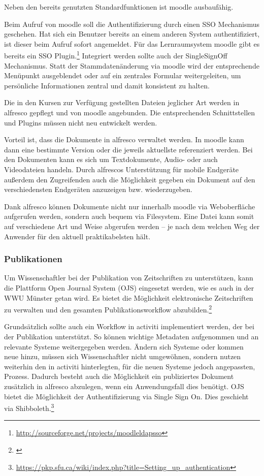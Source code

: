 Neben den bereits genutzten Standardfunktionen ist moodle ausbaufähig.

Beim Aufruf von moodle soll die Authentifizierung durch einen SSO Mechanismus geschehen. Hat sich ein Benutzer bereits an einem anderen System authentifiziert, ist dieser beim Aufruf sofort angemeldet. Für das Lernraumsystem moodle gibt es bereits ein SSO Plugin.\footnote{\url{http://sourceforge.net/projects/moodleldapsso}} Integriert werden sollte auch der SingleSignOff Mechanismus.
Statt der Stammdatenänderung via moodle wird der entsprechende Menüpunkt ausgeblendet oder auf ein zentrales Formular weitergeleiten, um persönliche Informationen zentral und damit konsistent zu halten.

Die in den Kursen zur Verfügung gestellten Dateien jeglicher Art werden in alfresco gepflegt und von moodle angebunden. Die entsprechenden Schnittstellen und Plugins müssen nicht neu entwickelt werden.

Vorteil ist, dass die Dokumente in alfresco verwaltet werden. In moodle kann dann eine bestimmte Version oder die jeweils aktuellste referenziert werden. Bei den Dokumenten kann es sich um Textdokumente, Audio- oder auch Videodateien handeln. Durch alfrescos Unterstützung für mobile Endgeräte außerdem den Zugreifenden auch die Möglichkeit gegeben ein Dokument auf den verschiedensten Endgeräten anzuzeigen bzw. wiederzugeben.

Dank alfresco können Dokumente nicht nur innerhalb moodle via Weboberfläche aufgerufen werden, sondern auch bequem via Filesystem. Eine Datei kann somit auf verschiedene Art und Weise abgerufen werden – je nach dem welchen Weg der Anwender für den aktuell praktikabelsten hält.

\subsubsection{Publikationen}
Um Wissenschaftler bei der Publikation von Zeitschriften zu unterstützen, kann die Plattform Open Journal System (OJS) eingesetzt werden, wie es auch in der WWU Münster getan wird. Es bietet die Möglichkeit elektronische Zeitschriften zu verwalten und den gesamten Publikationsworkflow abzubilden.\footnote{\cite{kloetgen_2012}}

Grundsätzlich sollte auch ein Workflow in activiti implementiert werden, der bei der Publikation unterstützt. So können wichtige Metadaten aufgenommen und an relevante Systeme weitergegeben werden. Ändern sich Systeme oder kommen neue hinzu, müssen sich Wissenschaftler nicht umgewöhnen, sondern nutzen weiterhin den in activiti hinterlegten, für die neuen Systeme jedoch angepassten, Prozess. Dadurch besteht auch die Möglichkeit ein publiziertes Dokument zusätzlich in alfresco abzulegen, wenn ein Anwendungsfall dies benötigt.
OJS bietet die Möglichkeit der Authentifizierung via Single Sign On. Dies geschieht via Shibboleth.\footnote{\url{https://pkp.sfu.ca/wiki/index.php?title=Setting_up_authentication}}

